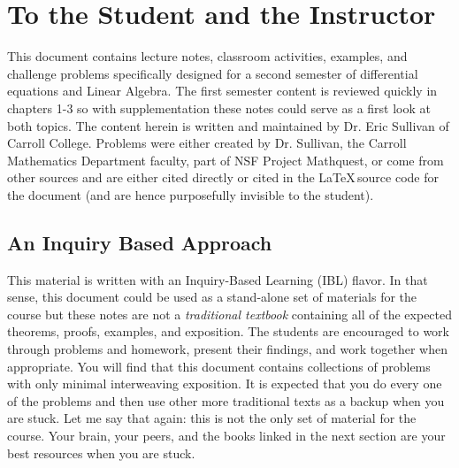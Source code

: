 \setcounter{chapter}{-1}
\chapter{To the Student and the Instructor}
This document contains lecture notes, classroom activities, examples, and challenge
problems specifically designed for a second semester of differential equations and Linear
Algebra.  The first semester content is reviewed quickly in chapters 1-3 so with
supplementation these notes could serve as a first look at both topics.  The content
herein is written and maintained by Dr. Eric Sullivan of Carroll College.  Problems were
either created by Dr. Sullivan, the Carroll Mathematics Department faculty, part of NSF
Project Mathquest, or come from other sources and are either cited directly or cited in
the \LaTeX\,source code for the document (and are hence purposefully invisible to the
student).


\section{An Inquiry Based Approach}

This material is written with an Inquiry-Based Learning (IBL) flavor. In that sense, this
document could be used as a stand-alone set of materials for the course but these notes
are not a {\it traditional textbook} containing all of the expected theorems, proofs,
examples, and exposition. The students are encouraged to work through problems and
homework, present their findings, and work together when appropriate. You will find that
this document contains collections of problems with only minimal interweaving exposition.
It is expected that you do every one of the problems and then use other more traditional
texts as a backup when you are stuck.  Let me say that again: this is not the only set of
material for the course.  Your brain, your peers, and the books linked in the next section
are your best resources when you are stuck.

